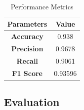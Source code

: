\begin{table}[h]
    \centering
    \renewcommand{\arraystretch}{1.5} %
    \begin{tabular}{|c|c|}
        \hline
        \textbf{Parameters} & \textbf{Value} \\
        \hline
        \textbf{Accuracy}   & 0.938          \\
        \hline
        \textbf{Precision}  & 0.9678         \\
        \hline
        \textbf{Recall}     & 0.9061         \\
        \hline
        \textbf{F1 Score}   & 0.93596        \\
        \hline
    \end{tabular}
    \caption{Performance Metrics}
    \label{tab:metrics}
\end{table}





\newpage
\subsection{Evaluation}

